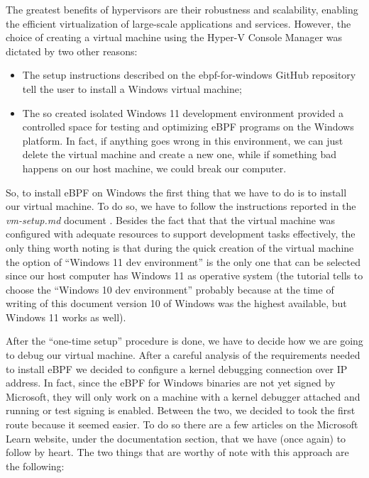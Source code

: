 The greatest benefits of hypervisors are their robustness and scalability, enabling the efficient virtualization of large-scale applications and services.
However, the choice of creating a virtual machine using the Hyper-V Console Manager was dictated by two other reasons:

\begin{itemize}
	\item 
		The setup instructions described on the ebpf-for-windows GitHub repository tell the user to install a Windows virtual machine;
	\item 
		The so created isolated Windows 11 development environment provided a controlled space for testing and optimizing eBPF programs on the Windows platform.
		In fact, if anything goes wrong in this environment, we can just delete the virtual machine and create a new one, while if something bad happens on our host machine, we could break our computer.
\end{itemize}

So, to install eBPF on Windows the first thing that we have to do is to install our virtual machine.
To do so, we have to follow the instructions reported in the \textit{vm-setup.md} document \cite{WinVMSetupDoc}.
Besides the fact that that the virtual machine was configured with adequate resources to support development tasks effectively, the only thing worth noting is that during the quick creation of the virtual machine the option of ``Windows 11 dev environment'' is the only one that can be selected since our host computer has Windows 11 as operative system (the tutorial tells to choose the ``Windows 10 dev environment'' probably because at the time of writing of this document version 10 of Windows was the highest available, but Windows 11 works as well).  

After the ``one-time setup'' procedure is done, we have to decide how we are going to debug our virtual machine.
After a careful analysis of the requirements needed to install eBPF we decided to configure a kernel debugging connection over IP address.
In fact, since the eBPF for Windows binaries are not yet signed by Microsoft, they will only work on a machine with a kernel debugger attached and running or test signing is enabled.
Between the two, we decided to took the first route because it seemed easier.
To do so there are a few articles on the Microsoft Learn website, under the documentation section, that we have (once again) to follow by heart.
The two things that are worthy of note with this approach are the following:

